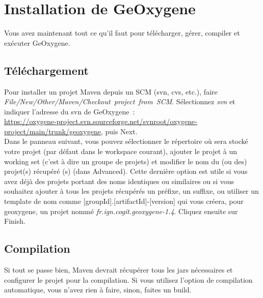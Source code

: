 %

\chapter{Installation de GeOxygene}


Vous avez maintenant tout ce qu'il faut pour télécharger, gérer, compiler et exécuter GeOxygene.


\section{Téléchargement}
Pour installer un projet Maven depuis un SCM (svn, cvs, etc.), faire\\
\emph{File/New/Other/Maven/Checkout~project~from~SCM}. Sélectionnez \emph{svn} et indiquer l'adresse du svn de GeOxygene~:\\
\href{https://oxygene-project.svn.sourceforge.net/svnroot/oxygene-project/main/trunk/geoxygene}{https://oxygene-project.svn.sourceforge.net/svnroot/oxygene-project/main/trunk/geoxygene}, puis Next.\\
Dans le panneau suivant, vous pouvez sélectionner le répertoire où sera stocké votre projet (par défaut dans le workspace courant), ajouter le projet à un working set (c'est à dire un groupe de projets) et modifier le nom du (ou des) projet(s) récupéré (s) (dans Advanced). Cette dernière option est utile si vous avez déjà des projets portant des noms identiques ou similaires ou si vous souhaitez ajouter à tous les projets récupérés un préfixe, un suffixe, ou utiliser un template de nom comme [groupId].[artifactId]-[version] qui vous créera, pour geoxygene, un projet nommé \emph{fr.ign.cogit.geoxygene-1.4}.
Cliquez ensuite sur Finish.


\section{Compilation}
Si tout se passe bien, Maven devrait récupérer tous les jars nécessaires et configurer le projet pour la compilation. Si vous utilisez l'option de compilation automatique, vous n'avez rien à faire, sinon, faites un build.



